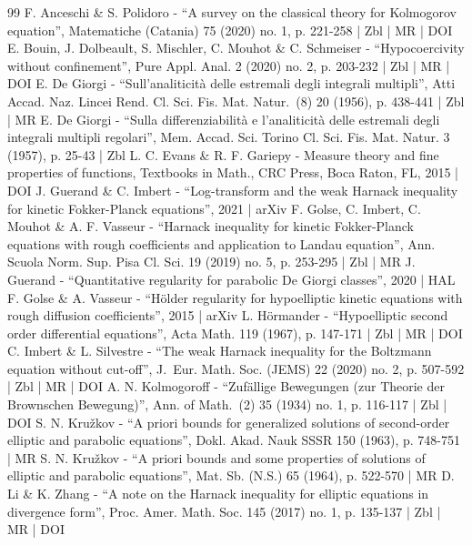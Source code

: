 \documentclass[10pt]{amsart}
\theoremstyle{definition}
\theoremstyle{remark}
\begin{document}
\vspace*{\baselineskip}\enlargethispage{-\baselineskip}


\begin{thebibliography}{99}
F. Anceschi \& S. Polidoro - “A survey on the classical theory for Kolmogorov equation”, Matematiche (Catania) 75 (2020) no. 1, p. 221-258 | Zbl | MR | DOI
E. Bouin, J. Dolbeault, S. Mischler, C. Mouhot \& C. Schmeiser - “Hypocoercivity without confinement”, Pure Appl. Anal. 2 (2020) no. 2, p. 203-232 | Zbl | MR | DOI
E. De Giorgi - “Sull’analiticità delle estremali degli integrali multipli”, Atti Accad. Naz. Lincei Rend. Cl. Sci. Fis. Mat. Natur. (8) 20 (1956), p. 438-441 | Zbl | MR
E. De Giorgi - “Sulla differenziabilità e l’analiticità delle estremali degli integrali multipli regolari”, Mem. Accad. Sci. Torino Cl. Sci. Fis. Mat. Natur. 3 (1957), p. 25-43 | Zbl
L. C. Evans \& R. F. Gariepy - Measure theory and fine properties of functions, Textbooks in Math., CRC Press, Boca Raton, FL, 2015 | DOI
J. Guerand \& C. Imbert - “Log-transform and the weak Harnack inequality for kinetic Fokker-Planck equations”, 2021 | arXiv
F. Golse, C. Imbert, C. Mouhot \& A. F. Vasseur - “Harnack inequality for kinetic Fokker-Planck equations with rough coefficients and application to Landau equation”, Ann. Scuola Norm. Sup. Pisa Cl. Sci. 19 (2019) no. 5, p. 253-295 | Zbl | MR
J. Guerand - “Quantitative regularity for parabolic De Giorgi classes”, 2020 | HAL
F. Golse \& A. Vasseur - “Hölder regularity for hypoelliptic kinetic equations with rough diffusion coefficients”, 2015 | arXiv
L. Hörmander - “Hypoelliptic second order differential equations”, Acta Math. 119 (1967), p. 147-171 | Zbl | MR | DOI
C. Imbert \& L. Silvestre - “The weak Harnack inequality for the Boltzmann equation without cut-off”, J. Eur. Math. Soc. (JEMS) 22 (2020) no. 2, p. 507-592 | Zbl | MR | DOI
A. N. Kolmogoroff - “Zufällige Bewegungen (zur Theorie der Brownschen Bewegung)”, Ann. of Math. (2) 35 (1934) no. 1, p. 116-117 | Zbl | DOI
S. N. Kružkov - “A priori bounds for generalized solutions of second-order elliptic and parabolic equations”, Dokl. Akad. Nauk SSSR 150 (1963), p. 748-751 | MR
S. N. Kružkov - “A priori bounds and some properties of solutions of elliptic and parabolic equations”, Mat. Sb. (N.S.) 65 (1964), p. 522-570 | MR
D. Li \& K. Zhang - “A note on the Harnack inequality for elliptic equations in divergence form”, Proc. Amer. Math. Soc. 145 (2017) no. 1, p. 135-137 | Zbl | MR | DOI

\end{thebibliography}
\end{document}
